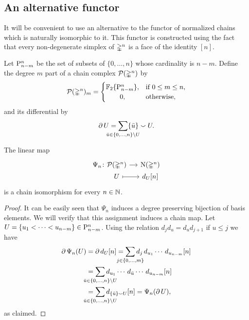 \subsection{An alternative functor}

It will be convenient to use an alternative to the functor of normalized chains which is naturally isomorphic to it.
This functor is constructed using the fact that every non-degenerate simplex of $\simplex^n$ is a face of the identity $[n]$.

\begin{definition}\label{d:dual chains}
	Let $\P_{n-m}^n$ be the set of subsets of $\{0, \dots, n\}$ whose cardinality is $n-m$.
	Define the degree $m$ part of a chain complex $\cP(\simplex^n)$ by
	\[
	\cP(\simplex^n)_m = \begin{cases}
	\F\{\P_{n-m}^n\}, & \text{if } 0 \leq m \leq n, \\
	\hfil 0, & \text{otherwise},
	\end{cases}
	\]
	and its differential by
	\begin{equation}\label{e:boundary of P}
	\bd U =
	\sum_{\mathclap{\bar u \in \{0, \dots, n\} \setminus U}} \{\bar u\} \union U.
	\end{equation}
\end{definition}

\begin{lemma}
	The linear map
	\[
	\begin{tikzcd} [column sep=small, row sep=0]
	\Psi_n \colon &[-20pt] \cP(\simplex^n) \arrow[r] & \chains(\simplex^n) \\
	& U \arrow[r, mapsto] & d_U [n]
	\end{tikzcd}
	\]
	is a chain isomorphism for every $n \in \N$.
\end{lemma}

\begin{proof}
	It can be easily seen that $\Psi_n$ induces a degree preserving bijection of basis elements.
	We will verify that this assignment induces a chain map.
	Let $U = \{u_1 < \cdots < u_{n-m}\} \in \rP_{n-m}^n$.
	Using the relation $d_jd_u = d_ud_{j+1}$ if $u \leq j$ we have
	\begin{align*}
	\bd \Psi_n(U) &=
	\bd d_U[n] =
	\sum_{\mathclap{j \in \{0, \dots, m\}}}
	d_j\, d_{u_1} \cdots\, d_{u_{n-m}}[n] \\ &=
	\sum_{\mathclap{\bar u \in \{0, \dots, n\} \setminus U}}
	d_{u_1} \cdots\, d_{\bar{u}} \cdots\, d_{u_{n-m}}[n] \\ &=
	\sum_{\mathclap{\bar u \in \{0, \dots, n\} \setminus U}}
	d_{\{\bar u\} \union U}[n] =
	\Psi_n(\bd U),
	\end{align*}
	as claimed.
\end{proof}

